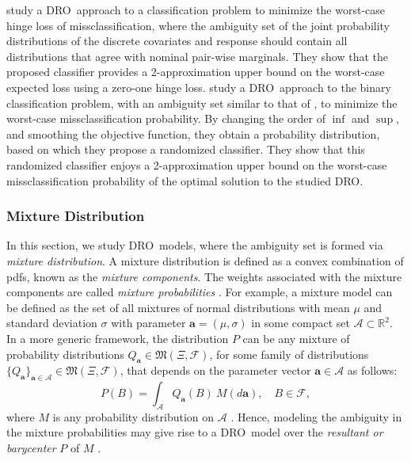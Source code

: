 \documentclass[final,onefignum,onetabnum]{class}
\newcommand{\bs}[1]{\boldsymbol{#1}} %
\newcommand{\Bs}[1]{\mathbb{#1}} %
\newcommand{\Cs}[1]{\mathcal{#1}} %
\newcommand{\Fs}[1]{\mathfrak{#1}} %
\newcommand{\measurespace}{\left( \Xi, \Cs{F} \right)}
\newcommand{\dro}{DRO}
\begin{document}
\citet{eban2014} study a \dro\ approach to a classification problem to minimize the worst-case hinge loss of  missclassification, where the ambiguity set of the joint probability distributions  of the discrete covariates and response should contain all distributions that agree with nominal pair-wise marginals. They show that the proposed classifier provides a 2-approximation upper bound on the worst-case expected  loss using a zero-one hinge loss.
\citet{razaviyayn2015} study a \dro\ approach to the binary classification problem, with an ambiguity set  similar to that of \citet{eban2014}, to minimize the worst-case missclassification probability. By changing the order of $\inf$ and $\sup$, and smoothing the objective function, they obtain a probability distribution, based on which they propose a randomized classifier. They show that this randomized classifier  enjoys a 2-approximation upper bound on the worst-case missclassification probability of the optimal solution to the studied \dro. 




\subsubsection{Mixture Distribution}

In this section, we study \dro\ models, where the ambiguity set is formed via {\it mixture distribution}. A mixture distribution is defined as a convex combination of pdfs, known as the {\it mixture components}. The weights associated with the mixture components are called {\it mixture probabilities} \cite{kapsos2014}. For example, a mixture model can be defined as the set of all mixtures of normal distributions with mean $\mu$ and standard deviation $\sigma$ with parameter $\bs{a}=(\mu, \sigma)$ in some compact set $\Cs{A} \subset \Bs{R}^{2}$. In a more generic framework, the distribution $P$ can be any mixture of probability distributions $Q_{\bs{a}} \in \Fs{M}\measurespace$, for some family of distributions $\{Q_{\bs{a}}\}_{\bs{a} \in \Cs{A}} \in \Fs{M}\measurespace$, that depends on the  parameter vector $\bs{a} \in \Cs{A}$ as follows:
\begin{equation}
    \label{eq: rev.mixture}
    P(B)=\int_{\Cs{A}} Q_{\bs{a}}(B)  \ M (d \bs{a}), \quad B \in \Cs{F},
\end{equation}
where $M$ is any probability distribution on $\Cs{A}$ \cite{lasserre2018representation}. 
Hence, modeling the ambiguity in the mixture probabilities may give rise to a \dro\ model over the {\it resultant or barycenter} $P$ of $M$ \cite{popescu2005semidefinite}. 
\end{document}
